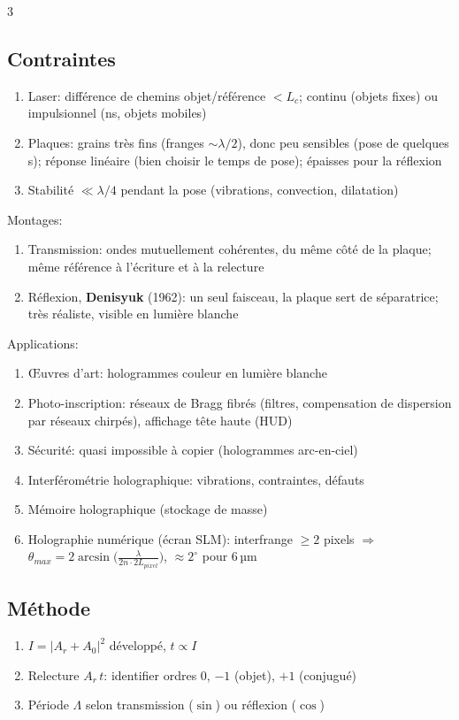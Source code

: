 \documentclass[12pt, a4paper]{article}
\begin{document}
\begin{multicols*}{3}
	\subsection{Contraintes}
	\begin{enumerate}[\roman*.]
		\item Laser: différence de chemins objet/référence $<L_c$; continu (objets fixes) ou impulsionnel (ns, objets mobiles)
		\item Plaques: grains très fins (franges $\sim\lambda/2$), donc peu sensibles (pose de quelques s); réponse linéaire (bien choisir le temps de pose); épaisses pour la réflexion
		\item Stabilité $\ll\lambda/4$ pendant la pose (vibrations, convection, dilatation)
	\end{enumerate}
	Montages:
	\begin{enumerate}[\roman*.]
		\item Transmission: ondes mutuellement cohérentes, du même côté de la plaque; même référence à l'écriture et à la relecture
		\item Réflexion, \textbf{Denisyuk} (1962): un seul faisceau, la plaque sert de séparatrice; très réaliste, visible en lumière blanche
	\end{enumerate}
	Applications:
	\begin{enumerate}[\roman*.]
		\item Œuvres d'art: hologrammes couleur en lumière blanche
		\item Photo-inscription: réseaux de Bragg fibrés (filtres, compensation de dispersion par réseaux chirpés), affichage tête haute (HUD)
		\item Sécurité: quasi impossible à copier (hologrammes arc-en-ciel)
		\item Interférométrie holographique: vibrations, contraintes, défauts
		\item Mémoire holographique (stockage de masse)
		\item Holographie numérique (écran SLM): interfrange $\geq2$ pixels $\Rightarrow$ $\theta_{max}=2\arcsin\big(\frac{\lambda}{2n\cdot2L_{pixel}}\big)$, $\approx2^\circ$ pour 6\,µm
	\end{enumerate}

	\subsection{Méthode}
	\begin{enumerate}[\roman*.]
		\item $I=|A_r+A_0|^2$ développé, $t\propto I$
		\item Relecture $A_r\,t$: identifier ordres 0, $-1$ (objet), $+1$ (conjugué)
		\item Période $\Lambda$ selon transmission ($\sin$) ou réflexion ($\cos$)
	\end{enumerate}



\end{multicols*}
\end{document}
